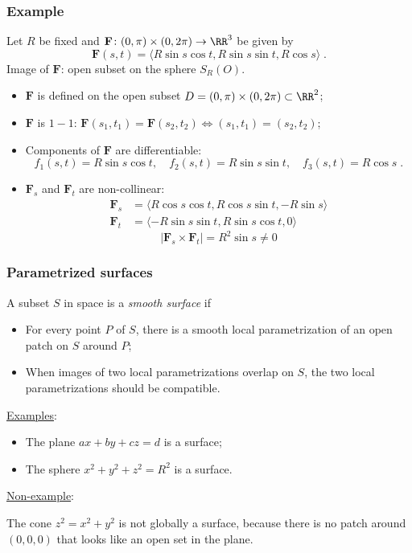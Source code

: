 \begin{frame}
  \frametitle{Example}

  Let $R$ be fixed and
  $\textbf{F} \colon (0,\pi)\times (0,2\pi) \to \RR^3$ be given by
%
$$\textbf{F}(s,t) = \langle R\sin{s}\cos{t}, R\sin{s}\sin{t}, R\cos{s}\rangle \; .$$
%
Image of $\textbf{F}$: \pause open subset on the sphere $S_R(O)$.\pause

\begin{itemize}
  \item  $\textbf{F}$ is defined on the open subset \pause $D= (0,\pi) \times (0,2\pi) \subset \RR^2$;\pause
  \item $\textbf{F}$ is $1-1$: \pause $\textbf{F}(s_1,t_1) = \textbf{F}(s_2,t_2) \Longleftrightarrow (s_1,t_1) = (s_2,t_2)$;\pause
  \item Components of $\textbf{F}$ are differentiable:\pause
  $$f_1(s,t) = R\sin{s}\cos{t}, \quad
  f_2(s,t) = R\sin{s}\sin{t}, \quad
  f_3(s,t) = R\cos{s}\; .$$
  \item \pause $\textbf{F}_s$ and $\textbf{F}_t$ are non-collinear:\pause
  \begin{align*}
    \textbf{F}_s & = \langle R\cos{s}\cos{t}, R\cos{s}\sin{t}, -R\sin{s} \rangle \\
    \textbf{F}_t & = \langle -R\sin{s}\sin{t}, R\sin{s}\cos{t}, 0 \rangle
  \end{align*}
%
$$|\textbf{F}_s \times \textbf{F}_t| = R^2\sin{s} \neq 0 $$
\end{itemize}

\end{frame}


\begin{frame}
  \frametitle{Parametrized surfaces}

  A subset $S$ in space is a \emph{smooth surface} if
%
\begin{itemize}
  \item For every point $P$ of $S$, there is a smooth local parametrization of an open patch on $S$ around $P$;
  \item When images of two local parametrizations overlap on $S$, the two local parametrizations should be compatible.
\end{itemize}

\noindent \underline{Examples}:
\begin{itemize}
  \item \pause The plane $ax+by+cz=d$ is a surface;
  \item \pause The sphere $x^2+y^2+z^2=R^2$ is a surface.
\end{itemize}

\pause \underline{Non-example}:

The cone $z^2= x^2+y^2$ is not globally a surface\pause , because there is no patch around $(0,0,0)$ that looks like an open set in the plane.
\end{frame}


